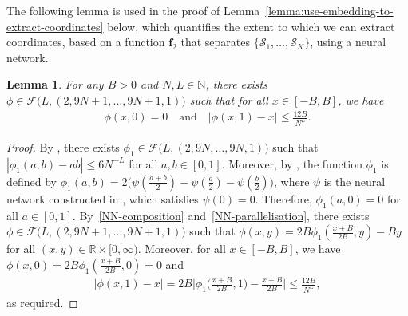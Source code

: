 \documentclass[12pt]{article}
\newtheorem{lemma}[thm]{Lemma}
\begin{document}
The following lemma is used in the proof of Lemma~\ref{lemma:use-embedding-to-extract-coordinates} below, which quantifies the extent to which we can extract coordinates, based on a function $\bm f_2$ that separates $\{\mathcal{S}_1,\ldots,\mathcal{S}_K\}$, using a neural network.
\begin{lemma} \label{lemma:approximate-multiplication-with-zero-one}
    For any $B>0$ and $N,L\in\mathbb{N}$, there exists $\phi \in \mathcal{F}\bigl(L,(2,9N+1,\ldots,9N+1,1)\bigr)$ such that for all $x\in[-B,B]$, we have
    \begin{align*}
        \phi(x,0) = 0 \quad\text{and}\quad |\phi(x,1)-x| \leq \frac{12B}{N^L}.
    \end{align*}
\end{lemma}
\begin{proof}
    By \citet[Lemma~5.2]{lu2021deep}, there exists $\phi_1 \in \mathcal{F}\bigl(L,(2,9N,\ldots,9N,1)\bigr)$ such that $|\phi_1(a,b)-ab| \leq 6N^{-L}$ for all $a,b\in[0,1]$. Moreover, by \citet[Eq~(5.2)]{lu2021deep}, the function $\phi_1$ is defined by $\phi_1(a,b) = 2\bigl(\psi(\frac{a+b}{2}) - \psi(\frac{a}{2}) - \psi(\frac{b}{2})\bigr)$, where $\psi$ is the neural network constructed in \citet[Lemma~5.1]{lu2021deep}, which satisfies $\psi(0) = 0$. Therefore, $\phi_1(a,0) = 0$ for all $a\in[0,1]$. 
    By~\ref{NN-composition} and~\ref{NN-parallelisation}, there exists $\phi\in\mathcal{F}\bigl(L,(2,9N+1,\ldots,9N+1,1)\bigr)$ such that $\phi(x,y) = 2B\phi_1(\frac{x+B}{2B}, y) - By$ for all $(x,y)\in\mathbb{R}\times[0,\infty)$. Moreover, for all $x\in[-B,B]$, we have $\phi(x,0) = 2B\phi_1(\frac{x+B}{2B}, 0) = 0$ and 
    \begin{align*}
        |\phi(x,1) - x| = 2B\biggl|\phi_1\biggl(\frac{x+B}{2B}, 1\biggr) - \frac{x+B}{2B}\biggr| \leq \frac{12B}{N^L},
    \end{align*}
    as required.
\end{proof}
\end{document}
